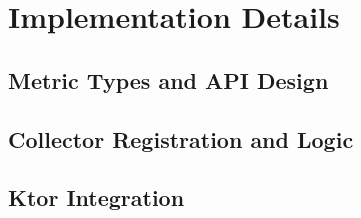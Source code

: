\usepackage{lipsum}


\chapter{Implementation Details} \label{cap:implementation}


\section{Metric Types and API Design}
\lipsum[1]


\section{Collector Registration and Logic}
\lipsum[1]


\section{Ktor Integration}
\lipsum[1]
